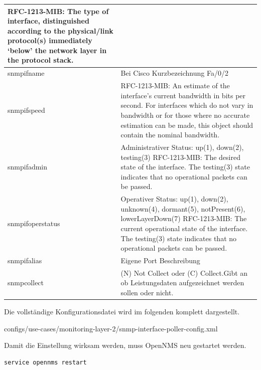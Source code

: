 \begin{longtable}{|p{3.5cm}|p{11cm}|}
RFC-1213-MIB: The type of interface, distinguished according to the physical/link protocol(s) immediately `below' the network layer in the protocol stack. \\
    \hline
    snmpifname    &    Bei Cisco Kurzbezeichnung Fa/0/2 \\
    \hline
    snmpifspeed    &    RFC-1213-MIB:  An estimate of the interface's current bandwidth in bits per second.  For interfaces which do not vary in bandwidth or for those where no accurate estimation can be made, this object should contain the nominal bandwidth. \\
    \hline
    snmpifadmin    &    Administrativer Status: up(1), down(2), testing(3)
RFC-1213-MIB: The desired state of the interface.  The testing(3) state indicates that no operational packets can be passed. \\
    \hline
    snmpifoperstatus    &    Operativer Status: up(1), down(2), unknown(4), dormant(5), notPresent(6), lowerLayerDown(7)
RFC-1213-MIB: The current operational state of the interface. The testing(3) state indicates that no operational packets can be passed. \\
    \hline
    snmpifalias    &    Eigene Port Beschreibung \\
    \hline
    snmpcollect    &    (N) Not Collect oder (C) Collect.Gibt an ob Leistungsdaten aufgezeichnet werden sollen oder nicht.
    \label{tbl:snmpifattrib}
\end{longtable}

Die vollständige Konfigurationsdatei wird im folgenden komplett dargestellt.


  {configs/use-cases/monitoring-layer-2/snmp-interface-poller-config.xml}

Damit die Einstellung wirksam werden, muss OpenNMS neu gestartet werden.
\begin{lstlisting}[numbers=none]
service opennms restart
\end{lstlisting}

